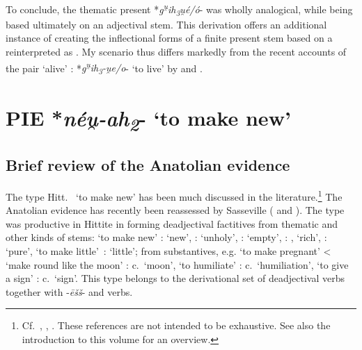\documentclass[output=paper,colorlinks,citecolor=brown]{langscibook}
\begin{document}
To conclude, the thematic present  *\textit{g\textsuperscript{u̯}ih\textsubscript{3}u̯é/ó}- was wholly analogical, while being based ultimately on an adjectival stem. This derivation offers an additional instance of creating the inflectional forms of a finite present stem based on a  reinterpreted as . My scenario thus differs markedly from the recent accounts of the pair  ‘alive’ : *\textit{g\textsuperscript{u̯}ih\textsubscript{3}-u̯e/o}-  ‘to live’ by \citet{VillanuevaSvensson2021} and \citet{Jasanoff2023}. 

\section{PIE *\textit{néu̯-ah\textsubscript{2}}- ‘to make new’}
\subsection{Brief review of the Anatolian evidence} \label{sec:3.1}

The type Hitt.\  ‘to make new’ has been much discussed in the literature.\footnote{Cf.\  \citealt[155, 240, 247, 253, 455--458]{Oettinger1979}, \citealt[132]{Melchert1997}, \citealt[139--141]{Jasanoff2003}. These references are not intended to be exhaustive. See also the introduction to this volume for an overview.} The Anatolian evidence has recently been reassessed by Sasseville (\citeyear{Sasseville2015} and \citeyear[16--77]{Sasseville2021}). The type was productive in Hittite in forming deadjectival    factitives  from thematic  and other kinds of stems:  ‘to make new’ :  ‘new’,  :  ‘unholy’,  :  ‘empty’,  : ,  ‘rich’,  :  ‘pure’,  ‘to make \mbox{little’ :}  ‘little’; from substantives, e.g.  ‘to make pregnant’ < ‘make round like the moon’ :  c.\ ‘moon’,  ‘to humiliate’ :  c.\ ‘humiliation’,  ‘to give a sign’ :  c.\ ‘sign’. This type belongs to the derivational set of deadjectival verbs together with  -\textit{ēšš}- and   verbs. 
\end{document}
